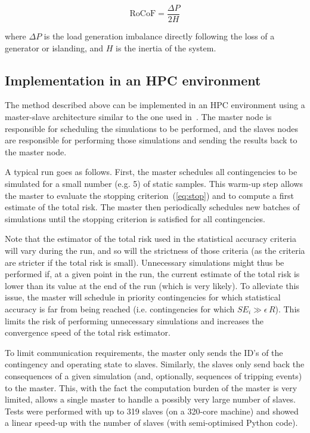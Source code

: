 \begin{equation}
\text{RoCoF} = \frac{\Delta P}{2 H}
\end{equation}

\noindent where \(\Delta P\) is the load generation imbalance directly following the loss of a generator or islanding, and \(H\) is the inertia of the system.


\subsection{Implementation in an HPC environment}
\label{sec:HPC}

The method described above can be implemented in an HPC environment using a master-slave architecture similar to the one used in~\cite{EurostagHPC}. The master node is responsible for scheduling the simulations to be performed, and the slaves nodes are responsible for performing those simulations and sending the results back to the master node.

A typical run goes as follows. First, the master schedules all contingencies to be simulated for a small number (e.g. 5) of static samples. This warm-up step allows the master to evaluate the stopping criterion~(\ref{eq:stop}) and to compute a first estimate of the total risk. The master then periodically schedules new batches of simulations until the stopping criterion is satisfied for all contingencies.

Note that the estimator of the total risk used in the statistical accuracy criteria will vary during the run, and so will the strictness of those criteria (as the criteria are stricter if the total risk is small). Unnecessary simulations might thus be performed if, at a given point in the run, the current estimate of the total risk is lower than its value at the end of the run (which is very likely). To alleviate this issue, the master will schedule in priority contingencies for which statistical accuracy is far from being reached (i.e. contingencies for which \(SE_i \gg \epsilon \, R\)). This limits the risk of performing unnecessary simulations and increases the convergence speed of the total risk estimator.

To limit communication requirements, the master only sends the ID's of the contingency and operating state to slaves. Similarly, the slaves only send back the consequences of a given simulation (and, optionally, sequences of tripping events) to the master. This, with the fact the computation burden of the master is very limited, allows a single master to handle a possibly very large number of slaves. Tests were performed with up to 319 slaves (on a 320-core machine) and showed a linear speed-up with the number of slaves (with semi-optimised Python code).


